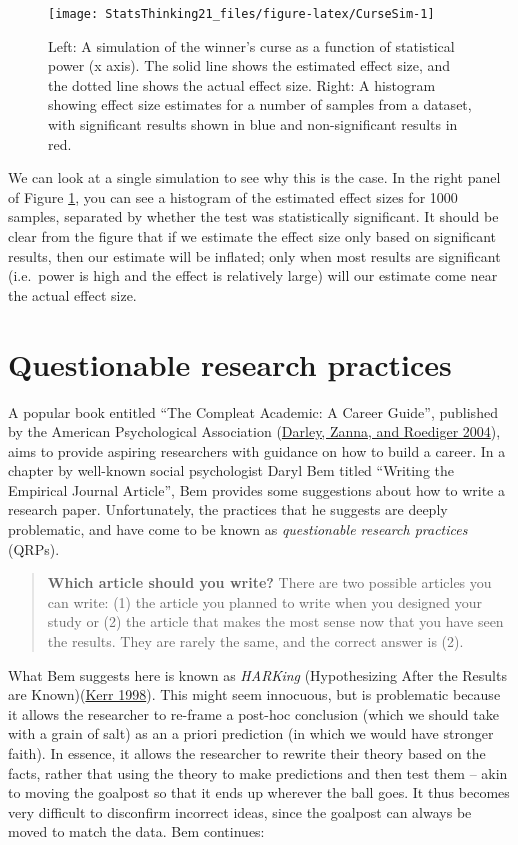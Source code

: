 \documentclass[
  12pt,
]{book}
\begin{document}
\begin{figure}
\texttt{[image: StatsThinking21\_files/figure-latex/CurseSim-1]} \caption{Left: A simulation of the winner's curse as a function of statistical power (x axis). The solid line shows the estimated effect size, and the dotted line shows the actual effect size. Right: A histogram showing effect size estimates for a number of samples from a dataset, with significant results shown in blue and non-significant results in red. }\label{fig:CurseSim}
\end{figure}

We can look at a single simulation to see why this is the case. In the right panel of Figure \ref{fig:CurseSim}, you can see a histogram of the estimated effect sizes for 1000 samples, separated by whether the test was statistically significant. It should be clear from the figure that if we estimate the effect size only based on significant results, then our estimate will be inflated; only when most results are significant (i.e.~power is high and the effect is relatively large) will our estimate come near the actual effect size.

\hypertarget{questionable-research-practices}{%
\section{Questionable research practices}\label{questionable-research-practices}}

A popular book entitled ``The Compleat Academic: A Career Guide'', published by the American Psychological Association (\protect\hyperlink{ref-darl:zann:roed:2004}{Darley, Zanna, and Roediger 2004}), aims to provide aspiring researchers with guidance on how to build a career. In a chapter by well-known social psychologist Daryl Bem titled ``Writing the Empirical Journal Article'', Bem provides some suggestions about how to write a research paper. Unfortunately, the practices that he suggests are deeply problematic, and have come to be known as \emph{questionable research practices} (QRPs).

\begin{quote}
\textbf{Which article should you write?} There are two possible articles you can write: (1) the article you planned to write when you designed your study or (2) the article that makes the most sense now that you have seen the results. They are rarely the same, and the correct answer is (2).
\end{quote}

What Bem suggests here is known as \emph{HARKing} (Hypothesizing After the Results are Known)(\protect\hyperlink{ref-kerr:1998}{Kerr 1998}). This might seem innocuous, but is problematic because it allows the researcher to re-frame a post-hoc conclusion (which we should take with a grain of salt) as an a priori prediction (in which we would have stronger faith). In essence, it allows the researcher to rewrite their theory based on the facts, rather that using the theory to make predictions and then test them -- akin to moving the goalpost so that it ends up wherever the ball goes. It thus becomes very difficult to disconfirm incorrect ideas, since the goalpost can always be moved to match the data. Bem continues:
\end{document}
